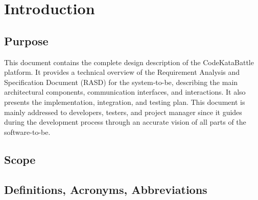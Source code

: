 \chapter{Introduction}

\section{Purpose}
This document contains the complete design description of the CodeKataBattle platform. 
It provides a technical overview of the Requirement Analysis and Specification Document (RASD) for the system-to-be, describing the main architectural components, communication interfaces, and interactions. 
It also presents the implementation, integration, and testing plan. 
This document is mainly addressed to developers, testers, and project manager since it guides during the development process through an accurate vision of all parts of the software-to-be. 

\section{Scope}


\section{Definitions, Acronyms, Abbreviations}
